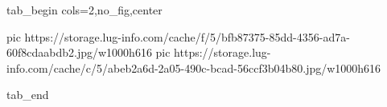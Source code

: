  
 
 
 
 


\ifcmt
  tab_begin cols=2,no_fig,center

     pic https://storage.lug-info.com/cache/f/5/bfb87375-85dd-4356-ad7a-60f8cdaabdb2.jpg/w1000h616%
		 pic https://storage.lug-info.com/cache/c/5/abeb2a6d-2a05-490c-bcad-56ccf3b04b80.jpg/w1000h616%

  tab_end
\fi
